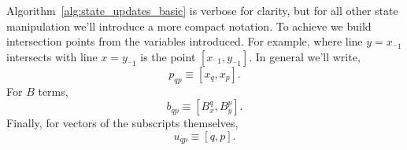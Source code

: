 Algorithm~\ref{alg:state_updates_basic} is verbose for clarity,
but for all other state manipulation we'll introduce a more compact
notation.  To achieve we build
 intersection points from the variables introduced.
For example,
where line $y = x_{^-1}$ intersects with line $x = y_{^-1}$ is
the point $[x_{^-1}, y_{^-1}]$.  In general we'll write,
\begin{equation} \label{eq:p_sm}
  p_{qp} \equiv [x_q, x_p].
\end{equation}
For $B$ terms,
\begin{equation}
  b_{qp} \equiv [B_x^q, B_y^p].
  \label{eq:b_sm}
\end{equation}
Finally, for vectors of the subscripts themselves,
\begin{equation}
  u_{qp} \equiv [q, p].
  \label{eq:u_sm}
\end{equation}

